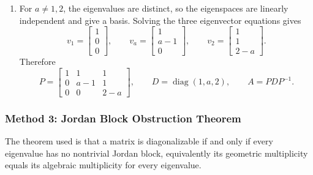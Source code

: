 \documentclass[12pt]{article}
\newcommand{\diag}{\operatorname{diag}}
\begin{document}
\begin{enumerate}[label=(\alph*)]
  \item For $a\ne1,2$, the eigenvalues are distinct, so the eigenspaces are linearly independent and give a basis. Solving the three eigenvector equations gives
  \[
  v_1=\begin{bmatrix}1\\0\\0\end{bmatrix},
  \qquad
  v_a=\begin{bmatrix}1\\a-1\\0\end{bmatrix},
  \qquad
  v_2=\begin{bmatrix}1\\1\\2-a\end{bmatrix}.
  \]
  Therefore
  \[
  \boxed{
  P=\begin{bmatrix}
  1&1&1\\
  0&a-1&1\\
  0&0&2-a
  \end{bmatrix},
  \qquad
  D=\diag(1,a,2),
  \qquad
  A=PDP^{-1}.}
  \]
\end{enumerate}

\newpage
\subsubsection{Method 3: Jordan Block Obstruction Theorem}
The theorem used is that a matrix is diagonalizable if and only if every eigenvalue has no nontrivial Jordan block, equivalently its geometric multiplicity equals its algebraic multiplicity for every eigenvalue.
\end{document}
